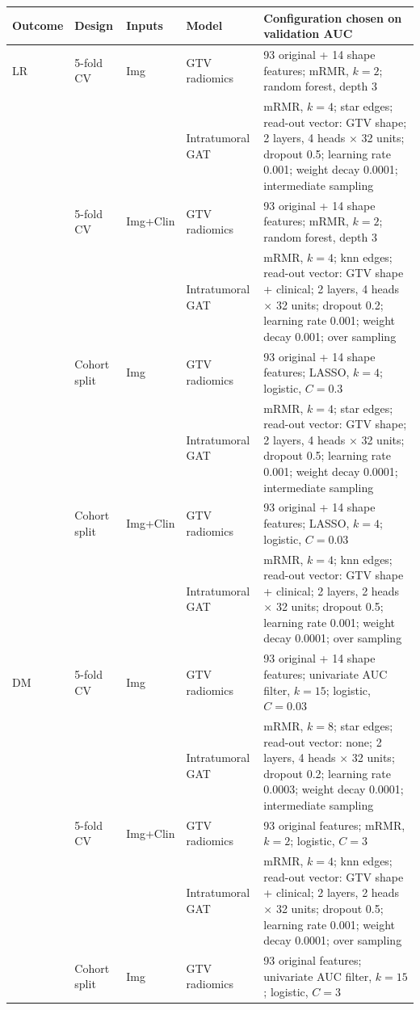 \begin{tabular}{@{}llllp{}@{}}
\toprule
Outcome & Design & Inputs & Model & Configuration chosen on validation AUC \\
\midrule
LR & 5-fold CV & Img & GTV radiomics & 93 original + 14 shape features; mRMR, $k=2$; random forest, depth 3 \\
 & & & Intratumoral GAT & mRMR, $k=4$; star edges; read-out vector: GTV shape; 2 layers, 4 heads $\times$ 32 units; dropout 0.5; learning rate 0.001; weight decay 0.0001; intermediate sampling \\
 & 5-fold CV & Img+Clin & GTV radiomics & 93 original + 14 shape features; mRMR, $k=2$; random forest, depth 3 \\
 & & & Intratumoral GAT & mRMR, $k=4$; knn edges; read-out vector: GTV shape + clinical; 2 layers, 4 heads $\times$ 32 units; dropout 0.2; learning rate 0.001; weight decay 0.001; over sampling \\
 & Cohort split & Img & GTV radiomics & 93 original + 14 shape features; LASSO, $k=4$; logistic, $C=0.3$ \\
 & & & Intratumoral GAT & mRMR, $k=4$; star edges; read-out vector: GTV shape; 2 layers, 4 heads $\times$ 32 units; dropout 0.5; learning rate 0.001; weight decay 0.0001; intermediate sampling \\
 & Cohort split & Img+Clin & GTV radiomics & 93 original + 14 shape features; LASSO, $k=4$; logistic, $C=0.03$ \\
 & & & Intratumoral GAT & mRMR, $k=4$; knn edges; read-out vector: GTV shape + clinical; 2 layers, 2 heads $\times$ 32 units; dropout 0.5; learning rate 0.001; weight decay 0.0001; over sampling \\
\midrule
DM & 5-fold CV & Img & GTV radiomics & 93 original + 14 shape features; univariate AUC filter, $k=15$; logistic, $C=0.03$ \\
 & & & Intratumoral GAT & mRMR, $k=8$; star edges; read-out vector: none; 2 layers, 4 heads $\times$ 32 units; dropout 0.2; learning rate 0.0003; weight decay 0.0001; intermediate sampling \\
 & 5-fold CV & Img+Clin & GTV radiomics & 93 original features; mRMR, $k=2$; logistic, $C=3$ \\
 & & & Intratumoral GAT & mRMR, $k=4$; knn edges; read-out vector: GTV shape + clinical; 2 layers, 2 heads $\times$ 32 units; dropout 0.5; learning rate 0.001; weight decay 0.0001; over sampling \\
 & Cohort split & Img & GTV radiomics & 93 original features; univariate AUC filter, $k=15$; logistic, $C=3$ \\

\end{tabular}
